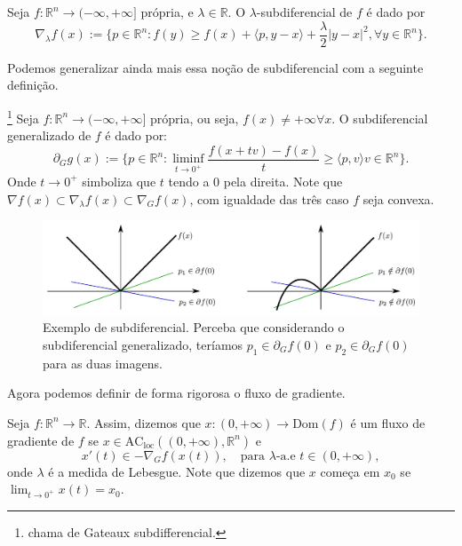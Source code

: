 \begin{definition}
    Seja $f:\mathbb R^n \to (-\infty, +\infty]$ própria, e $\lambda \in \mathbb R$.
    O $\lambda$-subdiferencial de $f$ é dado por
    \begin{equation}
        \nabla_\lambda f(x) := \{
            p \in \mathbb R^n: f(y) \geq f(x) + \langle p, y-x\rangle
            + \frac{\lambda}{2}|y-x|^2, \forall y \in \mathbb R^n\}.
    \end{equation}
\end{definition}

Podemos generalizar ainda mais essa noção de subdiferencial com a seguinte definição.
\begin{definition}
    \footnote{\citet{ambrosio2021lectures} chama de Gateaux subdifferencial.}
    Seja $f:\mathbb R^n \to (-\infty, +\infty]$ própria, ou seja, $f(x) \neq +\infty \forall x$.
    O subdiferencial generalizado de $f$ é dado por:
    \begin{equation}
        \partial_G g(x):= \{p \in \mathbb R^n: \liminf_{t\to 0^+}\frac{f(x+tv) - f(x)}{t}
        \geq \langle p,v \rangle v \in \mathbb R^n\}.
    \end{equation}
    Onde $t \to 0^+$ simboliza que $t$ tendo a $0$ pela direita.
    Note que $\nabla f(x)\subset \nabla_\lambda f(x) \subset \nabla_G f(x)$, com igualdade
    das três caso $f$ seja convexa.
\end{definition}

\begin{figure}[H]
    \includegraphics[width=1\textwidth]{./Figures/subdiferencial}
    \caption{Exemplo de subdiferencial. Perceba que considerando
    o subdiferencial generalizado, teríamos
    $p_1 \in \partial_G f(0)$ e $p_2 \in \partial_G f(0)$ para as duas imagens.}
    \label{fig:subdiferencial}
\end{figure}

Agora podemos definir de forma rigorosa o fluxo de gradiente.

\begin{definition}
    Seja $f:\mathbb R^n \to \mathbb R$.
    Assim, dizemos que $x:(0,+\infty) \to \text{Dom}(f)$ é um fluxo de gradiente
    de $f$ se $x \in \text{AC}_{\text{loc}}((0,+\infty), \mathbb R^n)$ e
    \begin{equation}
        x'(t) \in - \nabla_G f(x(t)), \quad \text{para } \lambda\text{-a.e } t \in (0,+\infty),
    \end{equation}
    onde $\lambda$ é a medida de Lebesgue. Note que dizemos que $x$ começa em $x_0$ se
    $\lim_{t \to 0^+} x(t) = x_0$.
\end{definition}

